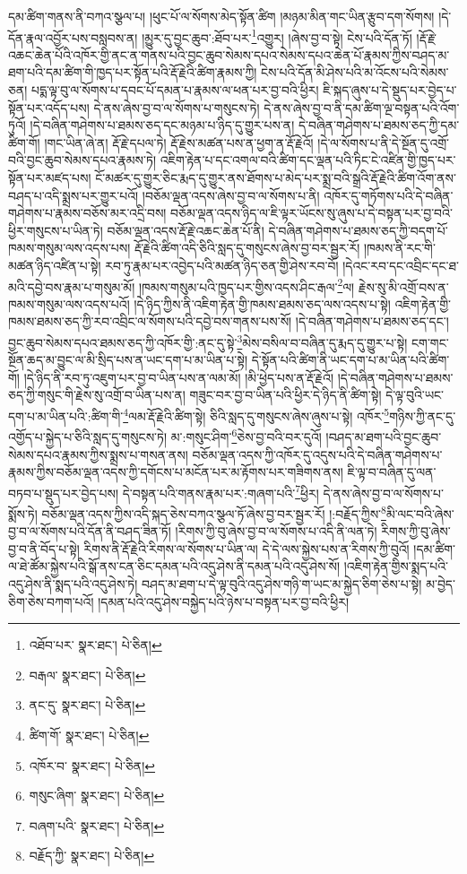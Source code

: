 དམ་ཚིག་གནས་ནི་བཀའ་སྩལ་པ། །ཕུང་པོ་ལ་སོགས་མེད་སྟོན་ཚིག །མཉམ་མིན་གང་ཡིན་རྩུབ་དག་སོགས། །དེ་དོན་རྣལ་འབྱོར་པས་བསླབས་ན། །མྱུར་དུ་བྱང་ཆུབ་:ཐོབ་པར་\footnote{འཐོབ་པར་  སྣར་ཐང་།  པེ་ཅིན། }འགྱུར། །ཞེས་བྱ་བ་སྟེ། ངེས་པའི་དོན་ཏོ། །རྡོ་རྗེ་འཆང་ཆེན་པོའི་འཁོར་གྱི་ནང་ན་གནས་པའི་བྱང་ཆུབ་སེམས་དཔའ་སེམས་དཔའ་ཆེན་པོ་རྣམས་ཀྱིས་བཤད་མ་ཐག་པའི་དམ་ཚིག་གི་ཁྱད་པར་སྟོན་པའི་རྡོ་རྗེའི་ཚིག་རྣམས་ཀྱི། ངེས་པའི་དོན་མི་ཤེས་པའི་མ་འོངས་པའི་སེམས་ཅན། པདྨ་ལྟ་བུ་ལ་སོགས་པ་དབང་པོ་དམན་པ་རྣམས་ལ་ཕན་པར་བྱ་བའི་ཕྱིར། ཇི་སྐད་ཞུས་པ་དེ་སྡུད་པར་བྱེད་པ་སྟོན་པར་འདོད་པས། དེ་ནས་ཞེས་བྱ་བ་ལ་སོགས་པ་གསུངས་ཏེ། དེ་ནས་ཞེས་བྱ་བ་ནི་དམ་ཚིག་ལྔ་བསྟན་པའི་འོག་ཏུའོ། །དེ་བཞིན་གཤེགས་པ་ཐམས་ཅད་དང་མཉམ་པ་ཉིད་དུ་གྱུར་པས་ན། དེ་བཞིན་གཤེགས་པ་ཐམས་ཅད་ཀྱི་དམ་ཚིག་གོ། །གང་ཡིན་ཞེ་ན། རྡོ་རྗེ་དཔལ་ཏེ། རྡོ་རྗེས་མཚན་པས་ན་ཕྱག་ན་རྡོ་རྗེའོ། །དེ་ལ་སོགས་པ་ནི་དེ་སྔོན་དུ་འགྲོ་བའི་བྱང་ཆུབ་སེམས་དཔའ་རྣམས་ཏེ། འཇིག་རྟེན་པ་དང་འགལ་བའི་ཚིག་དང་ལྡན་པའི་ཏིང་ངེ་འཛིན་གྱི་ཁྱད་པར་སྟོན་པར་མཛད་པས། ངོ་མཚར་དུ་གྱུར་ཅིང་རྨད་དུ་གྱུར་ནས་ཐོགས་པ་མེད་པར་སྨྲ་བའི་སྒྲའི་རྡོ་རྗེའི་ཚིག་འོག་ནས་བཤད་པ་འདི་སྨྲས་པར་གྱུར་པའོ། །བཅོམ་ལྡན་འདས་ཞེས་བྱ་བ་ལ་སོགས་པ་ནི། འཁོར་དུ་གཏོགས་པའི་དེ་བཞིན་གཤེགས་པ་རྣམས་བཅོས་མར་འདྲི་བས། བཅོམ་ལྡན་འདས་ཉིད་ལ་ཇི་ལྟར་ཡོངས་སུ་ཞུས་པ་དེ་བསྟན་པར་བྱ་བའི་ཕྱིར་གསུངས་པ་ཡིན་ཏེ། བཅོམ་ལྡན་འདས་རྡོ་རྗེ་འཆང་ཆེན་པོ་ནི། དེ་བཞིན་གཤེགས་པ་ཐམས་ཅད་ཀྱི་བདག་པོ་ཁམས་གསུམ་ལས་འདས་པས། རྡོ་རྗེའི་ཚིག་འདི་ཅིའི་སླད་དུ་གསུངས་ཞེས་བྱ་བར་སྦྱར་རོ། །ཁམས་ནི་རང་གི་མཚན་ཉིད་འཛིན་པ་སྟེ། རབ་ཏུ་རྣམ་པར་འབྱེད་པའི་མཚན་ཉིད་ཅན་གྱི་ཤེས་རབ་བོ། །དེའང་རབ་དང་འབྲིང་དང་ཐ་མའི་དབྱེ་བས་རྣམ་པ་གསུམ་མོ། །ཁམས་གསུམ་པའི་ཁྱད་པར་གྱིས་འདས་ཤིང་རྒལ་\footnote{བརྒལ་  སྣར་ཐང་།  པེ་ཅིན། }ལ། རྗེས་སུ་མི་འགྲོ་བས་ན་ཁམས་གསུམ་ལས་འདས་པའོ། །དེ་ཉིད་ཀྱིས་ནི་འཇིག་རྟེན་གྱི་ཁམས་ཐམས་ཅད་ལས་འདས་པ་སྟེ། འཇིག་རྟེན་གྱི་ཁམས་ཐམས་ཅད་ཀྱི་རབ་འབྲིང་ལ་སོགས་པའི་དབྱེ་བས་གནས་པས་སོ། །དེ་བཞིན་གཤེགས་པ་ཐམས་ཅད་དང་། བྱང་ཆུབ་སེམས་དཔའ་ཐམས་ཅད་ཀྱི་འཁོར་གྱི་:ནང་དུ་སྟེ་\footnote{ནང་དུ་  སྣར་ཐང་།  པེ་ཅིན། }མེས་བསིལ་བ་བཞིན་དུ་རྨད་དུ་གྱུར་པ་སྟེ། ངག་གང་སྔོན་ཆད་མ་བྱུང་ལ་མི་སྲིད་པས་ན་ཡང་དག་པ་མ་ཡིན་པ་སྟེ། དེ་སྟོན་པའི་ཚིག་ནི་ཡང་དག་པ་མ་ཡིན་པའི་ཚིག་གོ། །དེ་ཉིད་ནི་རབ་ཏུ་འཇུག་པར་བྱ་བ་ཡིན་པས་ན་ལམ་མོ། །མི་ཕྱེད་པས་ན་རྡོ་རྗེའོ། །དེ་བཞིན་གཤེགས་པ་ཐམས་ཅད་ཀྱི་གསུང་གི་རྗེས་སུ་འགྲོ་བ་ཡིན་པས་ན། གཟུང་བར་བྱ་བ་ཡིན་པའི་ཕྱིར་དེ་ཉིད་ནི་ཚིག་སྟེ། དེ་ལྟ་བུའི་ཡང་དག་པ་མ་ཡིན་པའི་:ཚིག་གི་\footnote{ཚིག་གོ་  སྣར་ཐང་།  པེ་ཅིན། }ལམ་རྡོ་རྗེའི་ཚིག་སྟེ། ཅིའི་སླད་དུ་གསུངས་ཞེས་ཞུས་པ་སྟེ། འཁོར་\footnote{འཁོར་བ་  སྣར་ཐང་།  པེ་ཅིན། }གཉིས་ཀྱི་ནང་དུ་འགྱོད་པ་སྐྱེད་པ་ཅིའི་སླད་དུ་གསུངས་ཏེ། མ་:གསུང་ཤིག་\footnote{གསུང་ཞིག་  སྣར་ཐང་།  པེ་ཅིན། }ཅེས་བྱ་བའི་བར་དུའོ། །བཤད་མ་ཐག་པའི་བྱང་ཆུབ་སེམས་དཔའ་རྣམས་ཀྱིས་སྨྲས་པ་གསན་ནས། བཅོམ་ལྡན་འདས་ཀྱི་འཁོར་དུ་འདུས་པའི་དེ་བཞིན་གཤེགས་པ་རྣམས་ཀྱིས་བཅོམ་ལྡན་འདས་ཀྱི་དགོངས་པ་མངོན་པར་མ་རྟོགས་པར་གཟིགས་ནས། ཇི་ལྟ་བ་བཞིན་དུ་ལན་བཏབ་པ་སྡུད་པར་བྱེད་པས། དེ་བསྟན་པའི་གནས་རྣམ་པར་:གཞག་པའི་\footnote{བཞག་པའི་  སྣར་ཐང་།  པེ་ཅིན། }ཕྱིར། དེ་ནས་ཞེས་བྱ་བ་ལ་སོགས་པ་སྨོས་ཏེ། བཅོམ་ལྡན་འདས་ཀྱིས་འདི་སྐད་ཅེས་བཀའ་སྩལ་ཏོ་ཞེས་བྱ་བར་སྦྱར་རོ། །:བརྗོད་ཀྱིས་\footnote{བརྗོད་ཀྱི་  སྣར་ཐང་།  པེ་ཅིན། }མི་ལང་བའི་ཞེས་བྱ་བ་ལ་སོགས་པའི་དོན་ནི་བཤད་ཟིན་ཏོ། །རིགས་ཀྱི་བུ་ཞེས་བྱ་བ་ལ་སོགས་པ་འདི་ནི་ལན་ཏེ། རིགས་ཀྱི་བུ་ཞེས་བྱ་བ་ནི་བོད་པ་སྟེ། རིགས་ནི་རྡོ་རྗེའི་རིགས་ལ་སོགས་པ་ཡིན་ལ། དེ་དེ་ལས་སྐྱེས་པས་ན་རིགས་ཀྱི་བུའོ། །དམ་ཚིག་ལ་ཐེ་ཚོམ་སྐྱེས་པའི་སྒོ་ནས་ངན་ཅིང་དམན་པའི་འདུ་ཤེས་ནི་དམན་པའི་འདུ་ཤེས་སོ། །འཇིག་རྟེན་གྱིས་སྨད་པའི་འདུ་ཤེས་ནི་སྨད་པའི་འདུ་ཤེས་ཏེ། བཤད་མ་ཐག་པ་དེ་ལྟ་བུའི་འདུ་ཤེས་གཉི་ག་ཡང་མ་སྐྱེད་ཅིག་ཅེས་པ་སྟེ། མ་བྱེད་ཅིག་ཅེས་བཀག་པའོ། །དམན་པའི་འདུ་ཤེས་བསྐྱེད་པའི་ཉེས་པ་བསྟན་པར་བྱ་བའི་ཕྱིར། 
